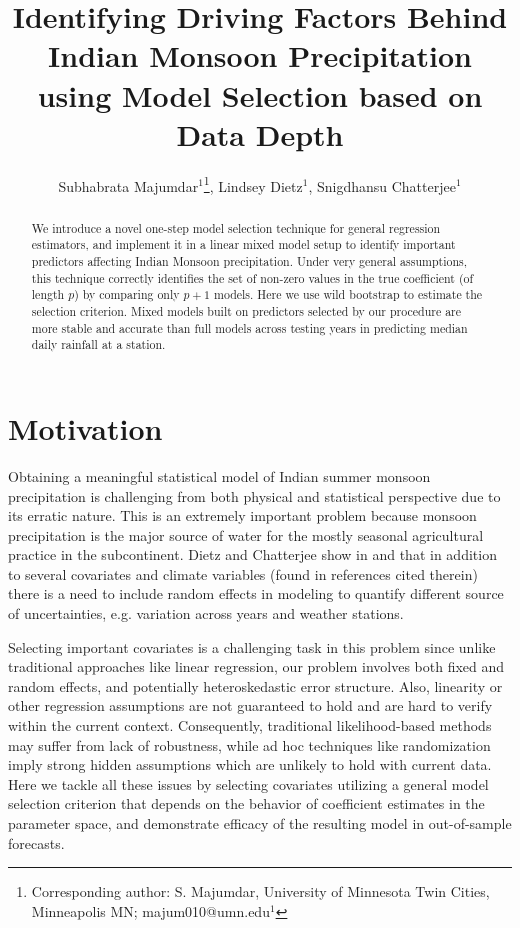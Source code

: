 \documentclass[11pt,twocolumn,twoside]{IEEEtran}
\begin{document}
\title{\vspace{0.2in}\sc Identifying Driving Factors Behind Indian Monsoon Precipitation using Model Selection based on Data Depth}
\author{Subhabrata Majumdar$^1$\thanks{Corresponding author: S. Majumdar, University of Minnesota Twin Cities, Minneapolis MN; majum010@umn.edu$^1$}, Lindsey Dietz$^1$, Snigdhansu Chatterjee$^1$}

\maketitle
\thispagestyle{fancy}

\begin{abstract}
We introduce a novel one-step model selection technique for general regression estimators, and implement it in a linear mixed model setup to identify important predictors affecting Indian Monsoon precipitation. Under very general assumptions, this technique correctly identifies the set of non-zero values in the true coefficient (of length $p$) by comparing only $p+1$ models. Here we use wild bootstrap to estimate the selection criterion. Mixed models built on predictors selected by our procedure are more stable and accurate than full models across testing years in predicting median daily rainfall at a station.
\end{abstract}

\section{Motivation}

Obtaining a meaningful statistical model of Indian summer monsoon precipitation is challenging from both physical and statistical perspective due to its erratic nature.  This is an extremely important problem because monsoon precipitation is the major source of water for the mostly seasonal agricultural practice in the subcontinent. Dietz and Chatterjee show in\cite{Dietz2014} and \cite{Dietz2015Chapter} that in addition to several covariates and climate variables (found in references cited therein) there is a need to include random effects in modeling to quantify different source of uncertainties, e.g. variation across years and weather stations.

Selecting important covariates is a challenging task in this problem since unlike traditional approaches like linear regression, our problem involves both fixed and random effects, and potentially heteroskedastic error structure. Also, linearity or other regression assumptions are not guaranteed to hold and are hard to verify within the current context. Consequently, traditional likelihood-based methods may suffer from lack of robustness, while ad hoc techniques like randomization imply strong hidden assumptions which are unlikely to hold with current data. Here we tackle all these issues by selecting covariates utilizing a general model selection criterion that depends on the behavior of coefficient estimates in the parameter space, and demonstrate efficacy of the resulting model in out-of-sample forecasts.
\end{document}
